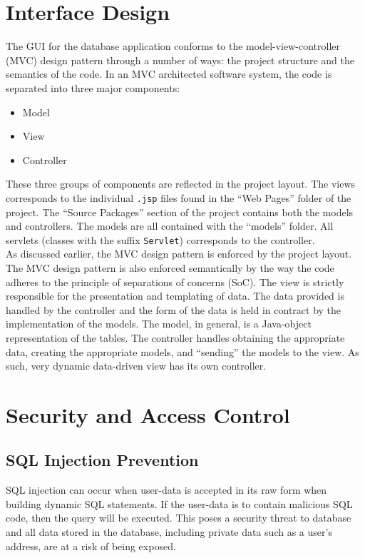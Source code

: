 \documentclass{article}
\begin{document}
\section{Interface Design}
The GUI for the database application conforms to the model-view-controller (MVC) design pattern through a number of ways: the project structure and the semantics of the code. In an MVC architected software system, the code is separated into three major components:
\begin{itemize}
	\item Model
	\item View
	\item Controller
\end{itemize}
These three groups of components are reflected in the project layout. The views corresponds to the individual \texttt{.jsp} files found in the ``Web Pages'' folder of the project. The ``Source Packages'' section of the project contains both the models and controllers. The models are all contained with the ``models'' folder. All servlets (classes with the suffix \texttt{Servlet}) corresponds to the controller. \\

As discussed earlier, the MVC design pattern is enforced by the project layout. The MVC design pattern is also enforced semantically by the way the code adheres to the principle of separations of concerns (SoC). The view is strictly responsible for the presentation and templating of data. The data provided is handled by the controller and the form of the data is held in contract by the implementation of the models. The model, in general, is a Java-object representation of the tables. The controller handles obtaining the appropriate data, creating the appropriate models, and ``sending'' the models to the view. As such, very dynamic data-driven view has its own controller.

\section{Security and Access Control}
\subsection{SQL Injection Prevention}
SQL injection can occur when user-data is accepted in its raw form when building dynamic SQL statements. If the user-data is to contain malicious SQL code, then the query will be executed. This poses a security threat to database and all data stored in the database, including private data such as a user's address, are at a risk of being exposed. \\
\end{document}
